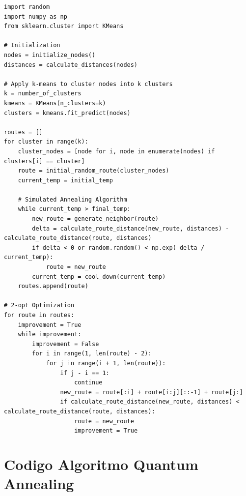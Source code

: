 \documentclass[11pt,a4paper,spanish]{book}
\begin{document}
\begin{lstlisting}
import random
import numpy as np
from sklearn.cluster import KMeans

# Initialization
nodes = initialize_nodes()
distances = calculate_distances(nodes)

# Apply k-means to cluster nodes into k clusters
k = number_of_clusters
kmeans = KMeans(n_clusters=k)
clusters = kmeans.fit_predict(nodes)

routes = []
for cluster in range(k):
    cluster_nodes = [node for i, node in enumerate(nodes) if clusters[i] == cluster]
    route = initial_random_route(cluster_nodes)
    current_temp = initial_temp
    
    # Simulated Annealing Algorithm
    while current_temp > final_temp:
        new_route = generate_neighbor(route)
        delta = calculate_route_distance(new_route, distances) - calculate_route_distance(route, distances)
        if delta < 0 or random.random() < np.exp(-delta / current_temp):
            route = new_route
        current_temp = cool_down(current_temp)
    routes.append(route)

# 2-opt Optimization
for route in routes:
    improvement = True
    while improvement:
        improvement = False
        for i in range(1, len(route) - 2):
            for j in range(i + 1, len(route)):
                if j - i == 1:
                    continue
                new_route = route[:i] + route[i:j][::-1] + route[j:]
                if calculate_route_distance(new_route, distances) < calculate_route_distance(route, distances):
                    route = new_route
                    improvement = True
\end{lstlisting}





\section{Codigo Algoritmo Quantum Annealing}
\end{document}
